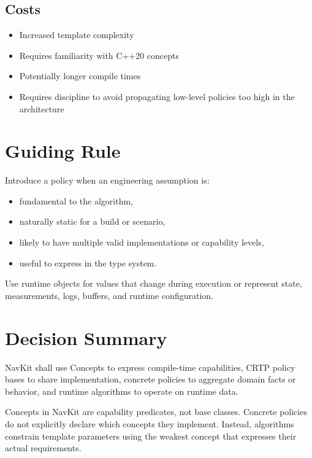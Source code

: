 \documentclass[11pt]{article}
\begin{document}
\subsection{Costs}

\begin{itemize}
    \item Increased template complexity
    \item Requires familiarity with C++20 concepts
    \item Potentially longer compile times
    \item Requires discipline to avoid propagating low-level policies too high
    in the architecture
\end{itemize}

\section{Guiding Rule}

Introduce a policy when an engineering assumption is:

\begin{itemize}
    \item fundamental to the algorithm,
    \item naturally static for a build or scenario,
    \item likely to have multiple valid implementations or capability levels,
    \item useful to express in the type system.
\end{itemize}

Use runtime objects for values that change during execution or represent
state, measurements, logs, buffers, and runtime configuration.

\section{Decision Summary}

NavKit shall use Concepts to express compile-time capabilities, CRTP policy
bases to share implementation, concrete policies to aggregate domain facts or
behavior, and runtime algorithms to operate on runtime data.

Concepts in NavKit are capability predicates, not base classes. Concrete
policies do not explicitly declare which concepts they implement. Instead,
algorithms constrain template parameters using the weakest concept that
expresses their actual requirements.
\end{document}
